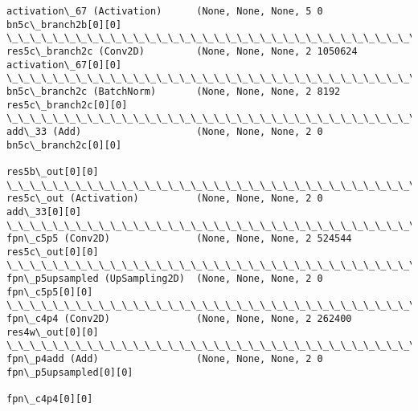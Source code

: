 \documentclass[11pt]{article}
\begin{document}
\begin{Verbatim}[commandchars=\\\{\}]
activation\_67 (Activation)      (None, None, None, 5 0           bn5c\_branch2b[0][0]              
\_\_\_\_\_\_\_\_\_\_\_\_\_\_\_\_\_\_\_\_\_\_\_\_\_\_\_\_\_\_\_\_\_\_\_\_\_\_\_\_\_\_\_\_\_\_\_\_\_\_\_\_\_\_\_\_\_\_\_\_\_\_\_\_\_\_\_\_\_\_\_\_\_\_\_\_\_\_\_\_\_\_\_\_\_\_\_\_\_\_\_\_\_\_\_\_\_\_
res5c\_branch2c (Conv2D)         (None, None, None, 2 1050624     activation\_67[0][0]              
\_\_\_\_\_\_\_\_\_\_\_\_\_\_\_\_\_\_\_\_\_\_\_\_\_\_\_\_\_\_\_\_\_\_\_\_\_\_\_\_\_\_\_\_\_\_\_\_\_\_\_\_\_\_\_\_\_\_\_\_\_\_\_\_\_\_\_\_\_\_\_\_\_\_\_\_\_\_\_\_\_\_\_\_\_\_\_\_\_\_\_\_\_\_\_\_\_\_
bn5c\_branch2c (BatchNorm)       (None, None, None, 2 8192        res5c\_branch2c[0][0]             
\_\_\_\_\_\_\_\_\_\_\_\_\_\_\_\_\_\_\_\_\_\_\_\_\_\_\_\_\_\_\_\_\_\_\_\_\_\_\_\_\_\_\_\_\_\_\_\_\_\_\_\_\_\_\_\_\_\_\_\_\_\_\_\_\_\_\_\_\_\_\_\_\_\_\_\_\_\_\_\_\_\_\_\_\_\_\_\_\_\_\_\_\_\_\_\_\_\_
add\_33 (Add)                    (None, None, None, 2 0           bn5c\_branch2c[0][0]              
                                                                 res5b\_out[0][0]                  
\_\_\_\_\_\_\_\_\_\_\_\_\_\_\_\_\_\_\_\_\_\_\_\_\_\_\_\_\_\_\_\_\_\_\_\_\_\_\_\_\_\_\_\_\_\_\_\_\_\_\_\_\_\_\_\_\_\_\_\_\_\_\_\_\_\_\_\_\_\_\_\_\_\_\_\_\_\_\_\_\_\_\_\_\_\_\_\_\_\_\_\_\_\_\_\_\_\_
res5c\_out (Activation)          (None, None, None, 2 0           add\_33[0][0]                     
\_\_\_\_\_\_\_\_\_\_\_\_\_\_\_\_\_\_\_\_\_\_\_\_\_\_\_\_\_\_\_\_\_\_\_\_\_\_\_\_\_\_\_\_\_\_\_\_\_\_\_\_\_\_\_\_\_\_\_\_\_\_\_\_\_\_\_\_\_\_\_\_\_\_\_\_\_\_\_\_\_\_\_\_\_\_\_\_\_\_\_\_\_\_\_\_\_\_
fpn\_c5p5 (Conv2D)               (None, None, None, 2 524544      res5c\_out[0][0]                  
\_\_\_\_\_\_\_\_\_\_\_\_\_\_\_\_\_\_\_\_\_\_\_\_\_\_\_\_\_\_\_\_\_\_\_\_\_\_\_\_\_\_\_\_\_\_\_\_\_\_\_\_\_\_\_\_\_\_\_\_\_\_\_\_\_\_\_\_\_\_\_\_\_\_\_\_\_\_\_\_\_\_\_\_\_\_\_\_\_\_\_\_\_\_\_\_\_\_
fpn\_p5upsampled (UpSampling2D)  (None, None, None, 2 0           fpn\_c5p5[0][0]                   
\_\_\_\_\_\_\_\_\_\_\_\_\_\_\_\_\_\_\_\_\_\_\_\_\_\_\_\_\_\_\_\_\_\_\_\_\_\_\_\_\_\_\_\_\_\_\_\_\_\_\_\_\_\_\_\_\_\_\_\_\_\_\_\_\_\_\_\_\_\_\_\_\_\_\_\_\_\_\_\_\_\_\_\_\_\_\_\_\_\_\_\_\_\_\_\_\_\_
fpn\_c4p4 (Conv2D)               (None, None, None, 2 262400      res4w\_out[0][0]                  
\_\_\_\_\_\_\_\_\_\_\_\_\_\_\_\_\_\_\_\_\_\_\_\_\_\_\_\_\_\_\_\_\_\_\_\_\_\_\_\_\_\_\_\_\_\_\_\_\_\_\_\_\_\_\_\_\_\_\_\_\_\_\_\_\_\_\_\_\_\_\_\_\_\_\_\_\_\_\_\_\_\_\_\_\_\_\_\_\_\_\_\_\_\_\_\_\_\_
fpn\_p4add (Add)                 (None, None, None, 2 0           fpn\_p5upsampled[0][0]            
                                                                 fpn\_c4p4[0][0]                   

\end{Verbatim}
\end{document}
